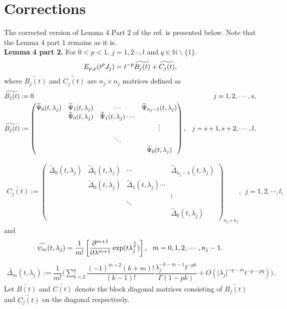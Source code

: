 	\section{Corrections}
	The corrected version of Lemma 4 Part 2 of the ref. \cite{deshpande2016local} is presented below. Note that the Lemma 4 part 1 remains as it is.\\
	\textbf{Lemma 4 part 2.}
		For $0 < p < 1$, $j=1,2 \cdots, l$ and $q \in \mathbb{N}\backslash\{1\}$.
		\begin{equation}
			E_{p,p}(t^{p} J_j) = t^{-p} \widetilde{B_j(t)} + \widetilde{C_j(t)},
		\end{equation} where $\widetilde{B_j(t)}$ and $\widetilde{C_j(t)}$ are $n_j \times n_j$ matrices defined as 
		\begin{align} \label{mat6}
			\nonumber \widetilde{B_j(t)} &:= \hfill 0    \hfill & j=1,2,\cdots,s, \\
			\widetilde{B_j(t)}&:= \hfill \begin{pmatrix}
				\widetilde{\Psi}_0(t,\lambda_j)& \widetilde{\Psi}_1(t,\lambda_j) & \cdots & \widetilde{\Psi}_{n_j-1}(t,\lambda_j)\\
				& \widetilde{\Psi}_0(t,\lambda_j) & \widetilde{\Psi}_1(t,\lambda_j)  \cdots & \\
				& & & \vdots \\
				&  & \ddots  & \\
				&  &  & \widetilde{\Psi}_0(t,\lambda_j)
			\end{pmatrix}, \hfill & j=s+1,s+2,\cdots,l, 
		\end{align}
		
		\begin{align} \label{mat4}
			\widetilde{C_j(t)} := \begin{pmatrix}
				\widetilde{\Delta}_0(t,\lambda_j) & \widetilde{\Delta}_1(t,\lambda_j) & \cdots & \widetilde{\Delta}_{n_j-1}(t,\lambda_j)\\
				&  \widetilde{\Delta}_0(t,\lambda_j)& \widetilde{\Delta}_1(t,\lambda_j)  \cdots & \\
				& & & \vdots \\
				&  & \ddots  & \\
				&  &  & \widetilde{\Delta}_0(t,\lambda_j)
			\end{pmatrix}_{n_j \times n_j}, ~~ j=1,2,\cdots,l,
		\end{align} 
		and 
		\begin{equation}
		\widetilde{\psi_m} (t, \lambda_j) = \frac{1}{m!} \left[ \dfrac{\partial^{m+1}}{\partial \lambda^{m+1}} \exp(t \lambda_j^{\frac{1}{p}})\right],~~m=0,1,2,\cdots,n_j-1. 
		\end{equation}
\begin{align} \label{delta}
\widetilde{\Delta_m}(t,\lambda_j):= \dfrac{1}{m!}\bigg( \sum_{k=2}^{q} \dfrac{(-1)^{m+2}(k+m)!}{(k-1)!} \dfrac{ \lambda_j ^{-k-m-1} t^{-pk}}{\Gamma(1-pk)} + O( \lvert\lambda_{j}\rvert^{-q-m} t^{-p-pq}) \bigg). 
\end{align}
Let $\widetilde{B(t)}$ and $\widetilde{C(t)}$ denote the block diagonal matrices consisting of $\widetilde{B_j(t)}$ and $\widetilde{C_j(t)}$ on the diagonal respectively. 
		
